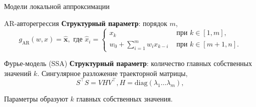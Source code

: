 \documentclass{beamer}
\newcommand{\bx}{\mathbf{x}}
\newcommand{\R}{\mathbb{R}}
\begin{document}
\begin{frame}{Модели локальной аппроксимации}
    \begin{block}{AR-авторегрессия}
        \textbf{Структурный параметр}: порядок $m$,
        $$
        g_{\text{AR}}(w, x) = \hat{\bx}, \text{ где }
        \hat{x}_i = \begin{cases}
            x_k & \text{ при } k \in [1, m], \\
            w_0 + \sum_{i=1}^m w_i x_{k - i} & \text{ при } k \in [m + 1, n].
        \end{cases}
        $$
    \end{block}


\begin{block}{Фурье-модель (SSA)}
    \textbf{Структурный параметр}: количество главных собственных значений $k$.
    Сингулярное разложение траекторной матрицы,
    $$
    S^\intercal S = VHV^\intercal, H = \mathrm{diag}(\lambda_1 \ldots \lambda_m),
    $$

    Параметры образуют $k$ главных собственных значения.
\end{block}
\end{frame}

\end{document}
